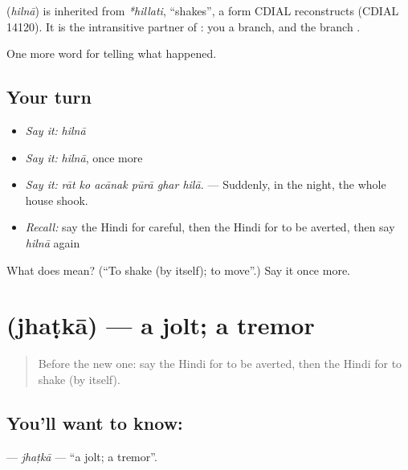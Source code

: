\begin{cousinweb}
\textbf{} (\emph{hilnā}) is inherited from \emph{*hillati}, \textquotedblleft{}shakes\textquotedblright{}, a form CDIAL reconstructs (CDIAL 14120). It is the intransitive partner of \textbf{}: you \textbf{ } a branch, and the branch \textbf{ }.
\end{cousinweb}

\begin{grammarlens}[title={What you've built}]
One more word for telling what happened.
\end{grammarlens}

\subsection*{Your turn}
\begin{itemize}
\raggedright
  \item \emph{Say it:} \emph{hilnā}
  \item \emph{Say it:} \emph{hilnā}, once more
  \item \emph{Say it:} \emph{rāt ko acānak pūrā ghar hilā.} — Suddenly, in the night, the whole house shook.
  \item \emph{Recall:} say the Hindi for careful, then the Hindi for to be averted, then say \emph{hilnā} again
\end{itemize}

\begin{tcolorbox}[breakable,colback=teal!4,colframe=teal!35!black,title={Before you move on}]
What does  mean? (\textquotedblleft{}To shake (by itself); to move\textquotedblright{}.) Say it once more.
\end{tcolorbox}
\section[\texorpdfstring{\hi{झटका} (jhaṭkā)}{झटका (jhaṭkā)}]{ (jhaṭkā) — a jolt; a tremor}

\label{lesson:HI-C303-jhatka}



\begin{quote}
Before the new one: say the Hindi for to be averted, then the Hindi for to shake (by itself).
\end{quote}

\subsection*{You'll want to know: }
\textbf{} — \emph{jhaṭkā} — \textquotedblleft{}a jolt; a tremor\textquotedblright{}.

